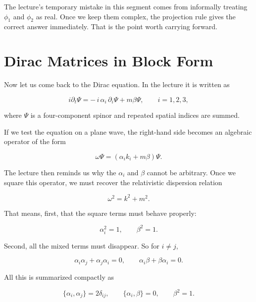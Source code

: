 The lecture's temporary mistake in this segment comes from informally treating \(\phi_1\) and \(\phi_2\) as real. Once we keep them complex, the projection rule gives the correct answer immediately. That is the point worth carrying forward.

\section{Dirac Matrices in Block Form}

Now let us come back to the Dirac equation. In the lecture it is written as

\begin{equation}
i\partial_t\Psi
=
-\,i\,\alpha_i\,\partial_i\Psi
+
m\beta\Psi,
\qquad i=1,2,3,
\end{equation}

where \(\Psi\) is a four-component spinor and repeated spatial indices are summed.

If we test the equation on a plane wave, the right-hand side becomes an algebraic operator of the form

\begin{equation}
\omega \Psi = \left(\alpha_i k_i + m\beta\right)\Psi.
\end{equation}

The lecture then reminds us why the \(\alpha_i\) and \(\beta\) cannot be arbitrary. Once we square this operator, we must recover the relativistic dispersion relation

\begin{equation}
\omega^2 = k^2 + m^2.
\end{equation}

That means, first, that the square terms must behave properly:

\begin{equation}
\alpha_i^2=1,
\qquad
\beta^2=1.
\end{equation}

Second, all the mixed terms must disappear. So for \(i\neq j\),

\begin{equation}
\alpha_i\alpha_j+\alpha_j\alpha_i=0,
\qquad
\alpha_i\beta+\beta\alpha_i=0.
\end{equation}

All this is summarized compactly as

\begin{equation}
\{\alpha_i,\alpha_j\}=2\delta_{ij},
\qquad
\{\alpha_i,\beta\}=0,
\qquad
\beta^2=1.
\end{equation}


